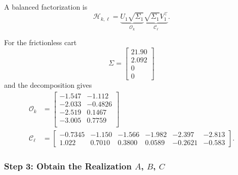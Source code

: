 A balanced factorization is
\begin{equation*}
  \mathcal{H}_{k,\ell} = \underbrace{U_1\sqrt{\Sigma_1}}_{\mathcal{O}_k} \underbrace{\sqrt{\Sigma_1}V_1^\top}_{\mathcal{C}_\ell}.
\end{equation*}

For the frictionless cart
\begin{equation*}
  \Sigma =
  \begin{bmatrix}
    21.90 \\ 2.092 \\ 0 \\ 0 \end{bmatrix}
\end{equation*}
and the decomposition gives
\begin{align*}
  \mathcal{O}_k &=
  \begin{bmatrix}
    -1.547 &  -1.112 \\
    -2.033 & -0.4826 \\
    -2.519 &  0.1467 \\
    -3.005 &  0.7759 \\
  \end{bmatrix} \\
  \mathcal{C}_\ell &=
  \begin{bmatrix}
    -0.7345 & -1.150 & -1.566 & -1.982 & -2.397 & -2.813 \\
    1.022 & 0.7010 & 0.3800 & 0.0589 & -0.2621 & -0.583
  \end{bmatrix}.
\end{align*}

\subsubsection{Step 3: Obtain the Realization $A$, $B$, $C$}
\label{sec:obtain-system-realization}

